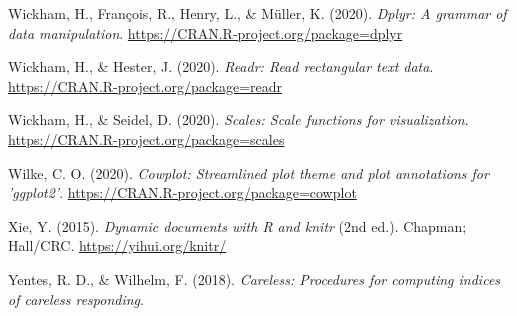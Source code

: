 \documentclass[
  english,
  man, noextraspace]{apa7}
\begin{document}
\begin{appendix}
\leavevmode\hypertarget{ref-R-dplyr}{}%
Wickham, H., François, R., Henry, L., \& Müller, K. (2020). \emph{Dplyr:
A grammar of data manipulation}.
\url{https://CRAN.R-project.org/package=dplyr}

\leavevmode\hypertarget{ref-R-readr}{}%
Wickham, H., \& Hester, J. (2020). \emph{Readr: Read rectangular text
data}. \url{https://CRAN.R-project.org/package=readr}

\leavevmode\hypertarget{ref-R-scales}{}%
Wickham, H., \& Seidel, D. (2020). \emph{Scales: Scale functions for
visualization}. \url{https://CRAN.R-project.org/package=scales}

\leavevmode\hypertarget{ref-R-cowplot}{}%
Wilke, C. O. (2020). \emph{Cowplot: Streamlined plot theme and plot
annotations for 'ggplot2'}.
\url{https://CRAN.R-project.org/package=cowplot}

\leavevmode\hypertarget{ref-R-knitr}{}%
Xie, Y. (2015). \emph{Dynamic documents with R and knitr} (2nd ed.).
Chapman; Hall/CRC. \url{https://yihui.org/knitr/}

\leavevmode\hypertarget{ref-R-careless}{}%
Yentes, R. D., \& Wilhelm, F. (2018). \emph{Careless: Procedures for
computing indices of careless responding}.

\endgroup
\end{appendix}
\end{document}
